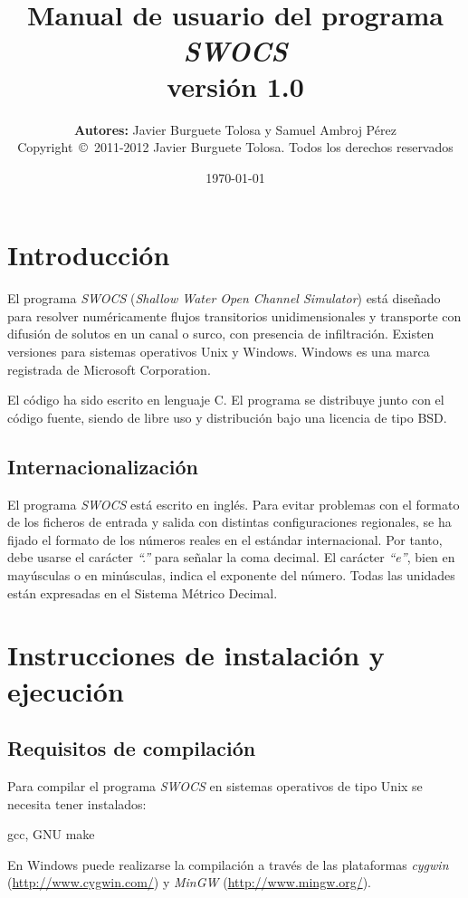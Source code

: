 \documentclass[a4paper,12pt]{report}
\title
{
	{\bf \Large Manual de usuario del programa \emph{SWOCS}}\\
	{\large	versión 1.0}
}
\author
{
	{\bf Autores:} Javier Burguete Tolosa y Samuel Ambroj Pérez\\
	{\small Copyright~\copyright~2011-2012 Javier Burguete Tolosa.
	Todos los derechos reservados}
}
\date{\today}
\newcommand{\swocs}{\emph{SWOCS}}
\newcommand{\IT}[1]{{\sl ``#1''}}
\begin{document}
\maketitle

\tableofcontents

\setlength{\parskip}{\baselineskip / 2}

\chapter{Introducción}

El programa {\swocs} ({\it Shallow Water Open Channel Simulator}) está diseñado para resolver numéricamente flujos
transitorios unidimensionales y transporte con difusión de solutos en un canal
o surco, con presencia de infiltración. 
Existen versiones para sistemas operativos Unix y Windows. Windows es una 
marca registrada de Microsoft Corporation.

El código ha sido escrito en lenguaje C. El programa se distribuye junto con 
el código fuente, siendo de libre uso y distribución bajo una licencia de tipo BSD.  

\section{Internacionalización}

El programa {\swocs} está escrito en inglés. Para evitar problemas con
el formato de los ficheros de entrada y salida con distintas configuraciones
regionales, se ha fijado el formato de los números reales en el estándar
internacional. Por tanto, debe usarse el carácter \IT{.} para señalar la coma
decimal. El carácter \IT{e}, bien en mayúsculas o en minúsculas, indica el
exponente del número. Todas las unidades están expresadas en el Sistema
Métrico Decimal.

\chapter{Instrucciones de instalación y ejecución}

\section{Requisitos de compilación}
Para compilar el programa {\swocs} en sistemas operativos de tipo Unix se
necesita tener instalados:
\begin{verbatimtab}
	gcc, GNU make
\end{verbatimtab}
En Windows puede realizarse la compilación a través de las plataformas
\emph{cygwin} (\url{http://www.cygwin.com/}) y \emph{MinGW}
(\url{http://www.mingw.org/}). 
\end{document}
